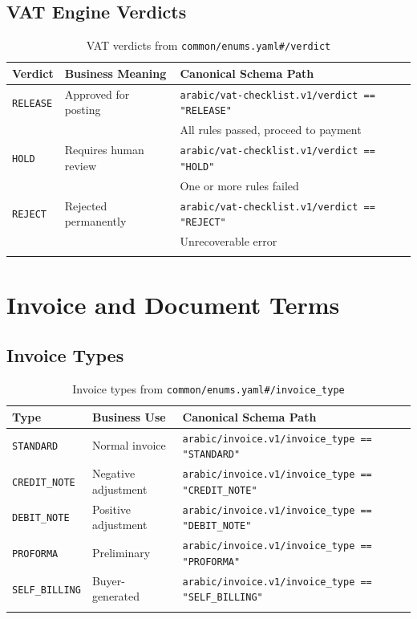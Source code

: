 \documentclass[11pt,a4paper]{report}
\newcommand{\schemapath}[1]{\texttt{\textcolor{pathcolor}{#1}}}
\newcommand{\enumval}[1]{\texttt{\textcolor{sapgreen}{#1}}}
\begin{document}
\section{VAT Engine Verdicts}

\begin{longtable}{@{}p{2cm}p{4cm}p{6cm}@{}}
\toprule
\textbf{Verdict} & \textbf{Business Meaning} & \textbf{Canonical Schema Path} \\
\midrule
\endhead
\enumval{RELEASE} & Approved for posting & \schemapath{arabic/vat-checklist.v1/verdict == "RELEASE"} \\
 & & \footnotesize All rules passed, proceed to payment \\[3pt]
\enumval{HOLD} & Requires human review & \schemapath{arabic/vat-checklist.v1/verdict == "HOLD"} \\
 & & \footnotesize One or more rules failed \\[3pt]
\enumval{REJECT} & Rejected permanently & \schemapath{arabic/vat-checklist.v1/verdict == "REJECT"} \\
 & & \footnotesize Unrecoverable error \\
\bottomrule
\caption{VAT verdicts from \schemapath{common/enums.yaml\#/verdict}}
\end{longtable}

\chapter{Invoice and Document Terms}

\section{Invoice Types}

\begin{longtable}{@{}p{3cm}p{3cm}p{6cm}@{}}
\toprule
\textbf{Type} & \textbf{Business Use} & \textbf{Canonical Schema Path} \\
\midrule
\endhead
\enumval{STANDARD} & Normal invoice & \schemapath{arabic/invoice.v1/invoice\_type == "STANDARD"} \\
\enumval{CREDIT\_NOTE} & Negative adjustment & \schemapath{arabic/invoice.v1/invoice\_type == "CREDIT\_NOTE"} \\
\enumval{DEBIT\_NOTE} & Positive adjustment & \schemapath{arabic/invoice.v1/invoice\_type == "DEBIT\_NOTE"} \\
\enumval{PROFORMA} & Preliminary & \schemapath{arabic/invoice.v1/invoice\_type == "PROFORMA"} \\
\enumval{SELF\_BILLING} & Buyer-generated & \schemapath{arabic/invoice.v1/invoice\_type == "SELF\_BILLING"} \\
\bottomrule
\caption{Invoice types from \schemapath{common/enums.yaml\#/invoice\_type}}
\end{longtable}
\end{document}
